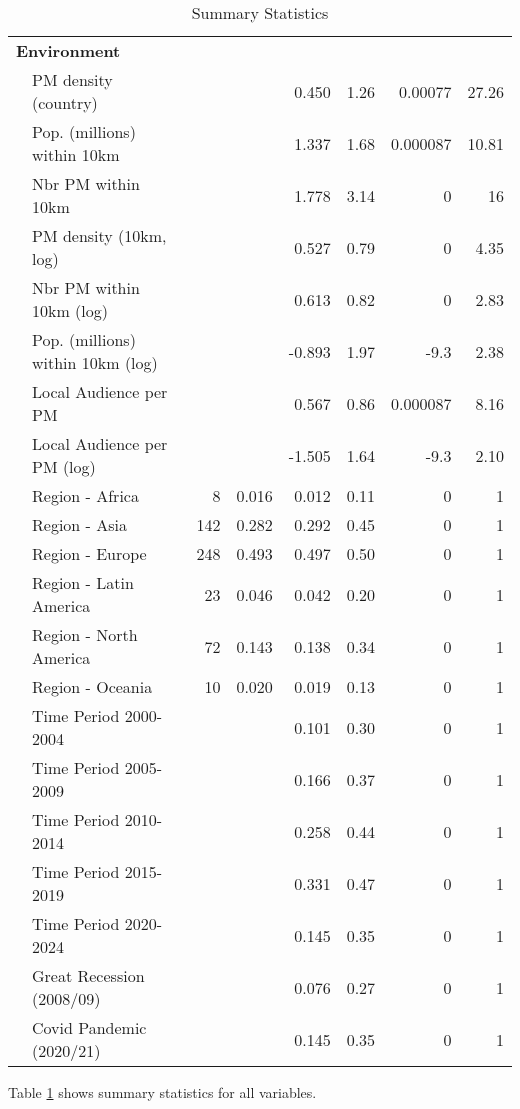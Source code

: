\documentclass[12pt]{article}
\begin{document}
\begin{table}[ht]
\begin{tabular}{llrrrrrr}
   \multicolumn{8}{l}{\textbf{Environment}} \\ 
 & PM density (country) &  &  &    0.450 &  1.26 & 0.00077 & 27.26 \\ 
   & Pop. (millions) within 10km &  &  &    1.337 &  1.68 & 0.000087 & 10.81 \\ 
   & Nbr PM within 10km &  &  &    1.778 &  3.14 & 0 & 16 \\ 
   & PM density (10km, log) &  &  &    0.527 &  0.79 & 0 & 4.35 \\ 
   & Nbr PM within 10km (log) &  &  &    0.613 &  0.82 & 0 & 2.83 \\ 
   & Pop. (millions) within 10km (log) &  &  &   -0.893 &  1.97 & -9.3 & 2.38 \\ 
   & Local Audience per PM &  &  &    0.567 &  0.86 & 0.000087 & 8.16 \\ 
   & Local Audience per PM (log) &  &  &   -1.505 &  1.64 & -9.3 & 2.10 \\ 
   & Region - Africa & 8 & 0.016 &    0.012 &  0.11 & 0 & 1 \\ 
   & Region - Asia & 142 & 0.282 &    0.292 &  0.45 & 0 & 1 \\ 
   & Region - Europe & 248 & 0.493 &    0.497 &  0.50 & 0 & 1 \\ 
   & Region - Latin America & 23 & 0.046 &    0.042 &  0.20 & 0 & 1 \\ 
   & Region - North America & 72 & 0.143 &    0.138 &  0.34 & 0 & 1 \\ 
   & Region - Oceania & 10 & 0.020 &    0.019 &  0.13 & 0 & 1 \\ 
   & Time Period 2000-2004 &  &  &    0.101 &  0.30 & 0 & 1 \\ 
   & Time Period 2005-2009 &  &  &    0.166 &  0.37 & 0 & 1 \\ 
   & Time Period 2010-2014 &  &  &    0.258 &  0.44 & 0 & 1 \\ 
   & Time Period 2015-2019 &  &  &    0.331 &  0.47 & 0 & 1 \\ 
   & Time Period 2020-2024 &  &  &    0.145 &  0.35 & 0 & 1 \\ 
   & Great Recession (2008/09) &  &  &    0.076 &  0.27 & 0 & 1 \\ 
   & Covid Pandemic (2020/21) &  &  &    0.145 &  0.35 & 0 & 1 \\ 
   \hline
\end{tabular}
\caption{Summary Statistics} 
\label{tbl:t_sumstats}
\end{table}

Table \ref{tbl:t_sumstats} shows summary statistics for all variables.
\end{document}
